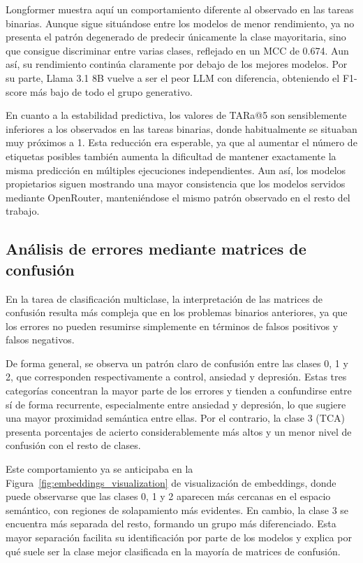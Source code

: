 Longformer muestra aquí un comportamiento diferente al observado en las tareas binarias. Aunque sigue situándose entre los modelos de menor rendimiento, ya no presenta el patrón degenerado de predecir únicamente la clase mayoritaria, sino que consigue discriminar entre varias clases, reflejado en un \ac{MCC} de 0.674. Aun así, su rendimiento continúa claramente por debajo de los mejores modelos. Por su parte, Llama 3.1 8B vuelve a ser el peor \ac{LLM} con diferencia, obteniendo el F1-score más bajo de todo el grupo generativo.

En cuanto a la estabilidad predictiva, los valores de \ac{TARa@5} son sensiblemente inferiores a los observados en las tareas binarias, donde habitualmente se situaban muy próximos a 1. Esta reducción era esperable, ya que al aumentar el número de etiquetas posibles también aumenta la dificultad de mantener exactamente la misma predicción en múltiples ejecuciones independientes. Aun así, los modelos propietarios siguen mostrando una mayor consistencia que los modelos servidos mediante OpenRouter, manteniéndose el mismo patrón observado en el resto del trabajo.

\subsection{Análisis de errores mediante matrices de confusión}

En la tarea de clasificación multiclase, la interpretación de las matrices de confusión resulta más compleja que en los problemas binarios anteriores, ya que los errores no pueden resumirse simplemente en términos de falsos positivos y falsos negativos.

De forma general, se observa un patrón claro de confusión entre las clases 0, 1 y 2, que corresponden respectivamente a control, ansiedad y depresión. Estas tres categorías concentran la mayor parte de los errores y tienden a confundirse entre sí de forma recurrente, especialmente entre ansiedad y depresión, lo que sugiere una mayor proximidad semántica entre ellas. Por el contrario, la clase 3 (TCA) presenta porcentajes de acierto considerablemente más altos y un menor nivel de confusión con el resto de clases.

Este comportamiento ya se anticipaba en la Figura~\ref{fig:embeddings_visualization} de visualización de embeddings, donde puede observarse que las clases 0, 1 y 2 aparecen más cercanas en el espacio semántico, con regiones de solapamiento más evidentes. En cambio, la clase 3 se encuentra más separada del resto, formando un grupo más diferenciado. Esta mayor separación facilita su identificación por parte de los modelos y explica por qué suele ser la clase mejor clasificada en la mayoría de matrices de confusión.

